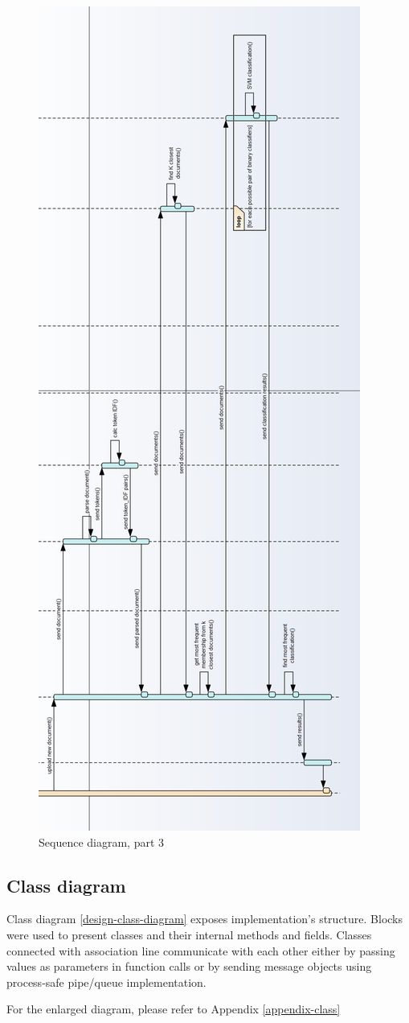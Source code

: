 \begin{figure}[H]
	\begin{center}
		\includegraphics[width=0.5\linewidth]{images/diagrams/seq3-h.png}
		\caption{Sequence diagram, part 3}
		\label{design-sequence-diagram-3}
	\end{center}
\end{figure}

\subsection{Class diagram}
Class diagram \ref{design-class-diagram} exposes implementation's structure. Blocks were used to present classes and their internal methods and fields. Classes connected with association line communicate with each other either by passing values as parameters in function calls or by sending message objects using process-safe pipe/queue implementation. 

For the enlarged diagram, please refer to Appendix \ref{appendix-class}


